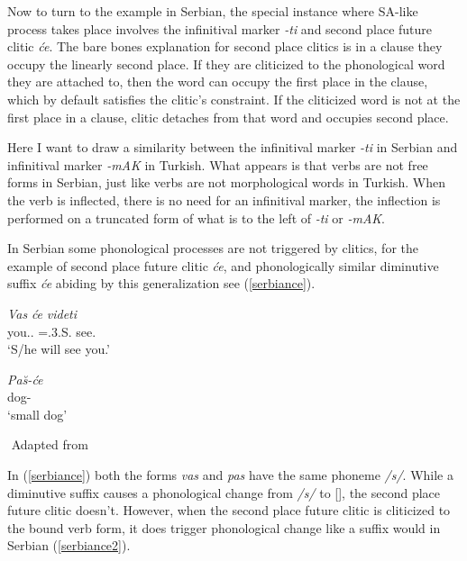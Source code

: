 Now to turn to the example in Serbian, the special instance where SA-like process takes place involves the infinitival marker \textit{-ti} and second place future clitic \textit{\'{c}e}. The bare bones explanation for second place clitics is in a clause they occupy the linearly second place. If they are cliticized to the phonological word they are attached to, then the word can occupy the first place in the clause, which by default satisfies the clitic's constraint. If the cliticized word is not at the first place in a clause, clitic detaches from that word and occupies second place.

Here I want to draw a similarity between the infinitival marker \textit{-ti} in Serbian and infinitival marker \textit{-mAK} in Turkish. What appears is that verbs are not free forms in Serbian, just like verbs are not morphological words in Turkish. When the verb is inflected, there is no need for an infinitival marker, the inflection is performed on a truncated form of what is to the left of \textit{-ti} or \textit{-mAK}.

In Serbian some phonological processes are not triggered by clitics, for the example of second place future clitic \textit{\'{c}e}, and phonologically similar diminutive suffix \textit{\'{c}e} abiding by this generalization see (\ref{serbiance}).

\begin{exe}
    \ex \label{serbiance}
    \begin{xlist}

        \ex \gll
        \textit{Vas} \textit{\'{c}e} \textit{videti} \\ you.{\Pl}.{\Acc} ={\Aux}.3.S.{\Fut} see.{\Inf} \\
        \glt `S/he will see you.'
 
        \ex \gll 
        \textit{Pa\u{s}-\'{c}e} \\ dog-{\Dim} \\
        \glt `small dog'

    \end{xlist}
    ${}$ \hfill Adapted from \cite{despic2017suspended}
\end{exe}

In (\ref{serbiance}) both the forms \textit{vas} and \textit{pas} have the same phoneme \textit{/s/}. While a diminutive suffix causes a phonological change from \textit{/s/} to [\textesh], the second place future clitic doesn't. However, when the second place future clitic is cliticized to the bound verb form, it does trigger phonological change like a suffix would in Serbian (\ref{serbiance2}).

